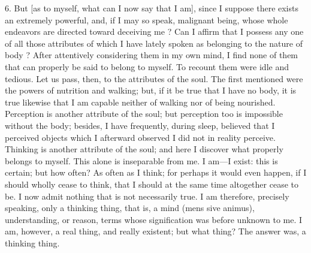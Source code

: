 6. But [as to myself, what can I now say that I am], since I suppose there exists an extremely powerful, and, if I may so speak, malignant being, whose whole endeavors are directed toward deceiving me ? Can I affirm that I possess any one of all those attributes of which I have lately spoken as belonging to the nature of body ? After attentively considering them in my own mind, I find none of them that can properly be said to belong to myself. To recount them were idle and tedious. Let us pass, then, to the attributes of the soul. The first mentioned were the powers of nutrition and walking; but, if it be true that I have no body, it is true likewise that I am capable neither of walking nor of being nourished. Perception is another attribute of the soul; but perception too is impossible without the body; besides, I have frequently, during sleep, believed that I perceived objects which I afterward observed I did not in reality perceive. Thinking is another attribute of the soul; and here I discover what properly belongs to myself. This alone is inseparable from me. I am—I exist: this is certain; but how often? As often as I think; for perhaps it would even happen, if I should wholly cease to think, that I should at the same time altogether cease to be. I now admit nothing that is not necessarily true. I am therefore, precisely speaking, only a thinking thing, that is, a mind (mens sive animus), understanding, or reason, terms whose signification was before unknown to me. I am, however, a real thing, and really existent; but what thing? The answer was, a thinking thing.

